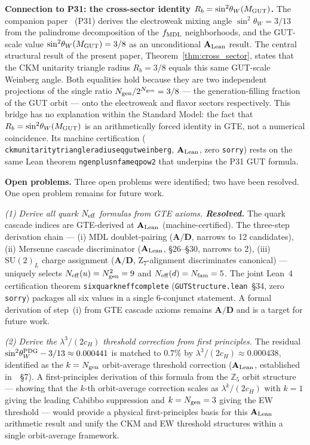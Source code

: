\documentclass[11pt]{article}
\theoremstyle{remark}
\newcommand{\Ngen}{N_{\rm gen}}
\newcommand{\Nfam}{N_{\rm fam}}
\newcommand{\cH}{c_H}
\newcommand{\lean}[1]{%
  \penalty-100
  \begingroup\def\_{\textunderscore\allowbreak}\texttt{#1}\endgroup}
\newcommand{\Rb}{R_b}
\newcommand{\sinwsq}{\sin^2\!\theta_W}
\newcommand{\CatAL}{\ensuremath{\textbf{A}_{\rm Lean}}}
\newcommand{\CatAD}{\textbf{A/D}}
\begin{document}
\medskip

\textbf{Connection to P31: the cross-sector identity $\Rb = \sinwsq(M_{\rm GUT})$.}
The companion paper~\cite{SpivackWeinberg} (P31) derives the electroweak mixing
angle $\sinwsq = 3/13$ from the palindrome decomposition of the $f_{\rm MDL}$
neighborhoods, and the GUT-scale value $\sinwsq(M_{\rm GUT}) = 3/8$ as an unconditional
$\CatAL$ result.
The central structural result of the present paper, Theorem~\ref{thm:cross_sector},
states that the CKM unitarity triangle radius $\Rb = 3/8$ equals this same GUT-scale
Weinberg angle.
Both equalities hold because they are two independent projections of the single
ratio $\Ngen/2^{\Ngen} = 3/8$ --- the generation-filling fraction of the GUT orbit ---
onto the electroweak and flavor sectors respectively.
This bridge has no explanation within the Standard Model: the fact that
$\Rb = \sinwsq(M_{\rm GUT})$ is an arithmetically forced identity in GTE, not
a numerical coincidence.
Its machine certification (\lean{ckm\_unitarity\_triangle\_radius\_eq\_gut\_weinberg},
$\CatAL$, zero \texttt{sorry}) rests on the same Lean theorem
\lean{ngen\_plus\_nfam\_eq\_pow2} that underpins the P31 GUT formula.

\medskip

\textbf{Open problems.}
Three open problems were identified; two have been resolved.
One open problem remains for future work.

\smallskip
\noindent\textit{(1) Derive all quark $N_{\rm eff}$ formulas from GTE axioms.
\textbf{Resolved.}}
The quark cascade indices are GTE-derived at $\CatAL$ (machine-certified).
The three-step derivation chain --- (i) MDL doublet-pairing ($\CatAD$, narrows to 12
candidates), (ii) Mersenne cascade discriminator ($\CatAL$, \S26--\S30, narrows to 2),
(iii) $\mathrm{SU}(2)_L$ charge assignment ($\CatAD$, Z\textsubscript{7}-alignment
discriminates canonical) --- uniquely selects $N_{\rm eff}(u) = \Ngen^2 = 9$ and
$N_{\rm eff}(d) = \Nfam = 5$.
The joint Lean~4 certification theorem \lean{six\_quark\_neff\_complete}
(\texttt{GUTStructure.lean}~\S34, zero \texttt{sorry}) packages
all six values in a single 6-conjunct statement.
A formal derivation of step~(i) from GTE cascade axioms remains $\CatAD$ and is a target
for future work.

\smallskip
\noindent\textit{(2) Derive the $\lambda^3/(2\cH)$ threshold correction from first principles.}
The residual $\sinwsq^{\rm PDG} - 3/13 \approx 0.000441$ is matched to $0.7\%$ by
$\lambda^3/(2\cH) \approx 0.000438$, identified as the $k = \Ngen$ orbit-average threshold
correction ($\CatAL$, established in~\cite{SpivackWeinberg}~\S7).
A first-principles derivation of this formula from the $\mathbb{Z}_5$ orbit structure
--- showing that the $k$-th orbit-average correction scales as
$\lambda^k/(2\cH)$ with $k=1$ giving the leading Cabibbo suppression and $k=\Ngen=3$ giving
the EW threshold --- would provide a physical first-principles basis for this $\CatAL$
arithmetic result and unify the CKM and EW threshold structures within a single orbit-average framework.
\end{document}
